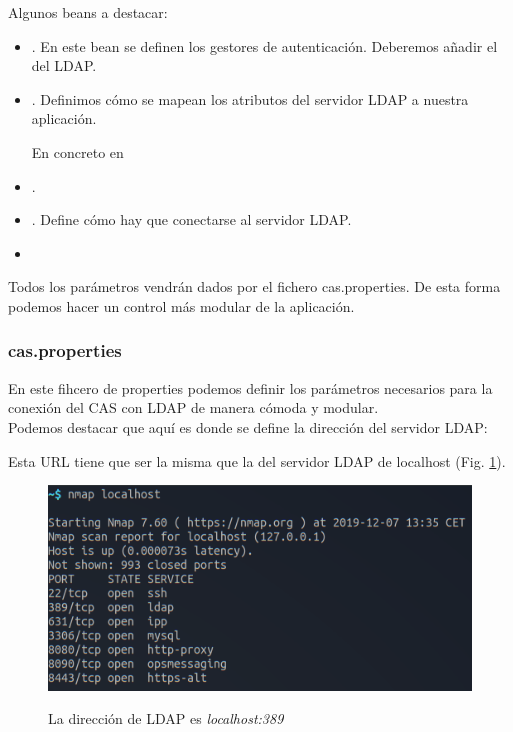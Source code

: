 \documentclass[10pt,a4paper]{article}
\begin{document}
Algunos beans a destacar:
\begin{itemize}
\item {}. En este bean se definen los gestores de autenticación. Deberemos añadir el del LDAP.

\item {}. Definimos cómo se mapean los atributos del servidor LDAP a nuestra aplicación.

En concreto en 
\item {}. 

\item {}. Define cómo hay que conectarse al servidor LDAP.

\item {}

\end{itemize}

Todos los parámetros vendrán dados por el fichero cas.properties. De esta forma podemos hacer un control más modular de la aplicación.

\subsubsection*{cas.properties}
En este fihcero de properties podemos definir los parámetros necesarios para la conexión del CAS con LDAP de manera cómoda y modular.\\

Podemos destacar que aquí es donde se define la dirección del servidor LDAP:


Esta URL tiene que ser la misma que la del servidor LDAP de localhost (Fig. \ref{fig:ldap}).
\begin{figure}[h!]
  \centering
   \includegraphics[scale=0.6]{nmap.png}\\
  \caption{La dirección de LDAP es \textit{localhost:389}}
  \label{fig:ldap}
\end{figure}\\
\pagebreak
\end{document}
